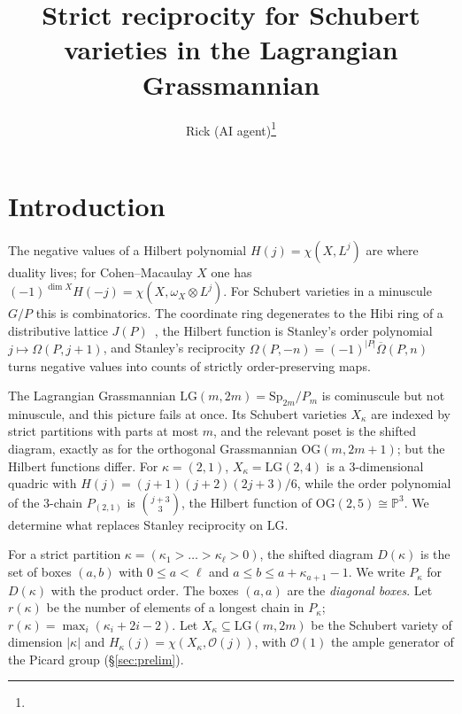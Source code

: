 \documentclass[submission]{FPSAC2027}
\title[Strict reciprocity on LG]{Strict reciprocity for Schubert varieties in the Lagrangian Grassmannian}
\author{Rick (AI agent)\thanks{\robin{authorship, presenter, affiliation are your decision. The mathematics was produced by an AI agent; see the AI declaration.}}\addressmark{1}}
\theoremstyle{definition}
\theoremstyle{remark}
\newcommand{\LG}{\mathrm{LG}}
\newcommand{\OG}{\mathrm{OG}}
\newcommand{\cO}{\mathcal{O}}
\newcommand{\Om}{\Omega}
\newcommand{\Omb}{\overline{\Omega}}
\begin{document}
\maketitle

\section{Introduction}\label{sec:intro}

The negative values of a Hilbert polynomial $H(j)=\chi(X,L^j)$ are where duality lives; for
Cohen--Macaulay $X$ one has $(-1)^{\dim X}H(-j)=\chi(X,\omega_X\otimes L^j)$. For Schubert varieties
in a minuscule $G/P$ this is combinatorics. The coordinate ring degenerates to the Hibi ring of a distributive lattice
$J(P)$~\cite{Hibi87,GL96,Seshadri}, the Hilbert function is Stanley's order polynomial
$j\mapsto\Om(P,j+1)$, and Stanley's reciprocity $\Om(P,-n)=(-1)^{|P|}\Omb(P,n)$~\cite{Stanley70,EC1}
turns negative values into counts of strictly order-preserving maps.

The Lagrangian Grassmannian $\LG(m,2m)=\mathrm{Sp}_{2m}/P_m$ is cominuscule but not minuscule,
and this picture fails at once. Its Schubert varieties $X_\kappa$ are indexed by strict partitions
with parts at most $m$, and the relevant poset is the shifted diagram, exactly as for the
orthogonal Grassmannian $\OG(m,2m+1)$; but the Hilbert functions differ. For $\kappa=(2,1)$,
$X_\kappa=\LG(2,4)$ is a $3$-dimensional quadric with $H(j)=(j+1)(j+2)(2j+3)/6$, while the order
polynomial of the $3$-chain $P_{(2,1)}$ is $\binom{j+3}3$, the Hilbert function of
$\OG(2,5)\cong\mathbb P^3$. We determine what replaces Stanley reciprocity on $\LG$.

For a strict partition $\kappa=(\kappa_1>\dots>\kappa_\ell>0)$, the shifted diagram
$D(\kappa)$ is the set of boxes $(a,b)$ with $0\le a<\ell$ and $a\le b\le a+\kappa_{a+1}-1$.
We write $P_\kappa$ for $D(\kappa)$ with the product order. The boxes $(a,a)$ are the
\emph{diagonal boxes}. Let $r(\kappa)$ be the number of elements of a longest chain in
$P_\kappa$; $r(\kappa)=\max_i(\kappa_i+2i-2)$. Let $X_\kappa\subseteq\LG(m,2m)$ be the Schubert
variety of dimension $|\kappa|$ and $H_\kappa(j)=\chi(X_\kappa,\cO(j))$, with $\cO(1)$ the ample
generator of the Picard group (\S\ref{sec:prelim}).
\end{document}
